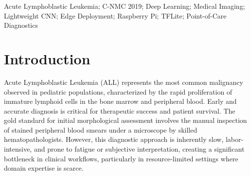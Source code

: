 \documentclass[journal]{IEEEtran}
\begin{document}
    \maketitle

    \begin{abstract}
    Acute Lymphoblastic Leukemia (ALL) is the most prevalent form of childhood leukemia, requiring rapid and accurate diagnosis for effective intervention. Current diagnostic protocols rely heavily on manual microscopic examination of peripheral blood smears, a process that is time-consuming, highly susceptible to inter-observer variability, and often unavailable in resource-constrained regions. In this paper, we present an automated, deep learning-based binary classification system engineered specifically for deployment at the edge, distinguishing between ALL leukemic blasts and healthy mononuclear cells. The model prioritizes computational efficiency without sacrificing clinical accuracy. Key methodological contributions include a strict subject-disjoint cross-validation scheme to prevent data leakage, a multiphase progressive backbone unfreezing strategy, and the integration of an Asymmetric Focal Loss function paired with an expanded classification head. This training paradigm stabilizes the classification head before adapting the backbone, penalizing hard-to-classify examples while preserving efficiency. Initial evaluations demonstrate robust classifier separability (0.9674 AUC-ROC), an improvement over baseline standard cross-entropy models. The resulting foundational model is built upon a MobileNetV3-Large backbone, designed for downstream quantization (e.g., TFLite INT8) and end-to-end deployment on embedded single-board computers, such as the Raspberry Pi 5, aiming to enable decentralized point-of-care diagnostic support.
    \end{abstract}

    \begin{IEEEkeywords}
    Acute Lymphoblastic Leukemia; C-NMC 2019; Deep Learning; Medical Imaging; Lightweight CNN; Edge Deployment; Raspberry Pi; TFLite; Point-of-Care Diagnostics
    \end{IEEEkeywords}

    \section{Introduction}
    Acute Lymphoblastic Leukemia (ALL) represents the most common malignancy observed in pediatric populations, characterized by the rapid proliferation of immature lymphoid cells in the bone marrow and peripheral blood. Early and accurate diagnosis is critical for therapeutic success and patient survival. The gold standard for initial morphological assessment involves the manual inspection of stained peripheral blood smears under a microscope by skilled hematopathologists. However, this diagnostic approach is inherently slow, labor-intensive, and prone to fatigue or subjective interpretation, creating a significant bottleneck in clinical workflows, particularly in resource-limited settings where domain expertise is scarce.
\end{document}
